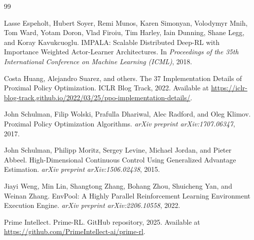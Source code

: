 \documentclass{article}
\begin{document}
\begin{thebibliography}{99}

Lasse Espeholt, Hubert Soyer, Remi Munos, Karen Simonyan, Volodymyr Mnih, Tom Ward,
Yotam Doron, Vlad Firoiu, Tim Harley, Iain Dunning, Shane Legg, and Koray Kavukcuoglu.
IMPALA: Scalable Distributed Deep-RL with Importance Weighted Actor-Learner Architectures.
In \emph{Proceedings of the 35th International Conference on Machine Learning (ICML)}, 2018.

Costa Huang, Alejandro Suarez, and others.
The 37 Implementation Details of Proximal Policy Optimization.
ICLR Blog Track, 2022. Available at
\url{https://iclr-blog-track.github.io/2022/03/25/ppo-implementation-details/}.

John Schulman, Filip Wolski, Prafulla Dhariwal, Alec Radford, and Oleg Klimov.
Proximal Policy Optimization Algorithms.
\emph{arXiv preprint arXiv:1707.06347}, 2017.

John Schulman, Philipp Moritz, Sergey Levine, Michael Jordan, and Pieter Abbeel.
High-Dimensional Continuous Control Using Generalized Advantage Estimation.
\emph{arXiv preprint arXiv:1506.02438}, 2015.

Jiayi Weng, Min Lin, Shangtong Zhang, Bohang Zhou, Shuicheng Yan, and Weinan Zhang.
EnvPool: A Highly Parallel Reinforcement Learning Environment Execution Engine.
\emph{arXiv preprint arXiv:2206.10558}, 2022.

Prime Intellect.
Prime-RL.
GitHub repository, 2025. Available at
\url{https://github.com/PrimeIntellect-ai/prime-rl}.

\end{thebibliography}
\end{document}

